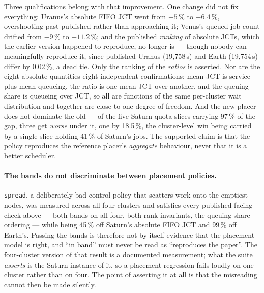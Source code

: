 Three qualifications belong with that improvement. One change did not fix
everything: Uranus's absolute FIFO JCT went from $+5$\,\% to $-6.4$\,\%,
overshooting past published rather than approaching it; Venus's queued-job count
drifted from $-9$\,\% to $-11.2$\,\%; and the published \emph{ranking} of
absolute JCTs, which the earlier version happened to reproduce, no longer is ---
though nobody can meaningfully reproduce it, since published Uranus
(19{,}758\,s) and Earth (19{,}754\,s) differ by 0.02\,\%, a dead tie. Only the
ranking of the \emph{ratios} is asserted. Nor are the eight absolute quantities
eight independent confirmations: mean JCT is service plus mean queueing, the
ratio is one mean JCT over another, and the queuing share is queueing over JCT,
so all are functions of the same per-cluster wait distribution and together are
close to one degree of freedom. And the new placer does not dominate the old ---
of the five Saturn quota slices carrying 97\,\% of the gap, three get
\emph{worse} under it, one by 18.5\,\%, the cluster-level win being carried by a
single slice holding 41\,\% of Saturn's jobs. The supported claim is that the policy
reproduces the reference placer's \emph{aggregate} behaviour, never that it is a
better scheduler.

\paragraph{The bands do not discriminate between placement policies.}
\texttt{spread}, a deliberately bad control policy that scatters work onto the
emptiest nodes, was measured across all four clusters and satisfies every
published-facing check above --- both bands on all four, both rank invariants,
the queuing-share ordering --- while being 45\,\% off Saturn's absolute FIFO JCT
and 99\,\% off Earth's. Passing the bands is therefore not by itself evidence
that the placement model is right, and ``in band'' must never be read as
``reproduces the paper''. The four-cluster version of that result is a
documented measurement; what the suite \emph{asserts} is the Saturn instance of
it, so a placement regression fails loudly on one cluster rather than on four.
The point of asserting it at all is that the misreading cannot then be made
silently.

